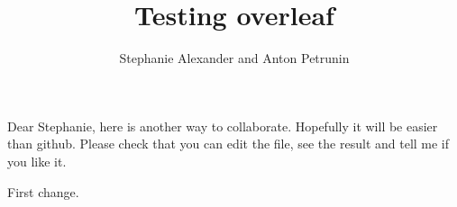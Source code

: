 \documentclass{article}
\begin{document}
 
\title{Testing overleaf}
\author{Stephanie Alexander and Anton Petrunin}
\date{}
\maketitle

Dear Stephanie, here is another way to collaborate.
Hopefully it will be easier than github.
Please check that you can edit the file, see the result and tell me if you like it.

First change.
\end{document}
